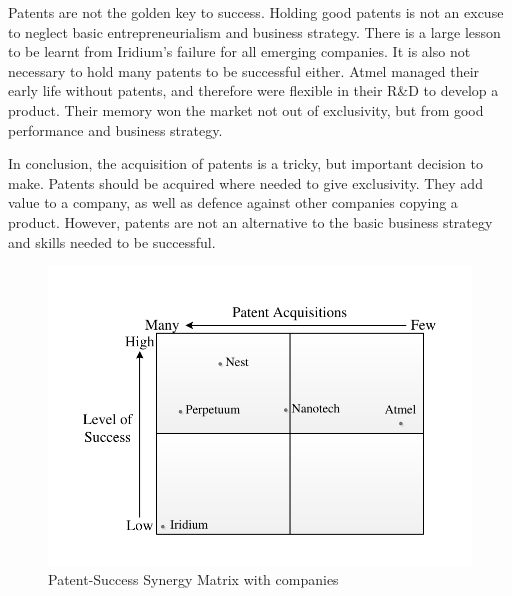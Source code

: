 Patents are not the golden key to success. 
Holding good patents is not an excuse to neglect basic entrepreneurialism and business strategy. 
There is a large lesson to be learnt from Iridium's failure for all emerging companies.
It is also not necessary to hold many patents to be successful either.
Atmel managed their early life without patents, and therefore were flexible in their R\&D to develop a product. 
Their memory won the market not out of exclusivity, but from good performance and business strategy.

In conclusion, the acquisition of patents is a tricky, but important decision to make.
Patents should be acquired where needed to give exclusivity.
They add value to a company, as well as defence against other companies copying a product.
However, patents are not an alternative to the basic business strategy and skills needed to be successful.


\begin{figure}
\centering
\includegraphics{Figures/SuccessMatrixScale.pdf}
\caption{Patent-Success Synergy Matrix with companies }
\label{fig:pssm:companies}
\end{figure}

